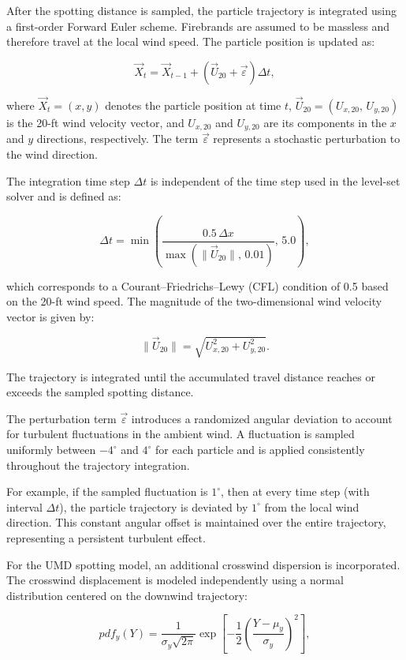 After the spotting distance is sampled, the particle trajectory is integrated using a first-order Forward Euler scheme. Firebrands are assumed to be massless and therefore travel at the local wind speed. The particle position is updated as:

\[
\vec{X}_t = \vec{X}_{t-1} + \left(\vec{U}_{20} + \vec{\varepsilon}\right)\Delta t,
\]

where $\vec{X}_t = (x,y)$ denotes the particle position at time $t$, $\vec{U}_{20} = (U_{x,20},\, U_{y,20})$ is the 20-ft wind velocity vector, and $U_{x,20}$ and $U_{y,20}$ are its components in the $x$ and $y$ directions, respectively. The term $\vec{\varepsilon}$ represents a stochastic perturbation to the wind direction.

The integration time step $\Delta t$ is independent of the time step used in the level-set solver and is defined as:

\[
\Delta t = \min\!\left( \frac{0.5 \, \Delta x}{\max(\|\vec{U}_{20}\|,\, 0.01)}, \, 5.0 \right),
\]

which corresponds to a Courant--Friedrichs--Lewy (CFL) condition of 0.5 based on the 20-ft wind speed. The magnitude of the two-dimensional wind velocity vector is given by:

\[
\|\vec{U}_{20}\| = \sqrt{U_{x,20}^2 + U_{y,20}^2}.
\]

The trajectory is integrated until the accumulated travel distance reaches or exceeds the sampled spotting distance.

The perturbation term $\vec{\varepsilon}$ introduces a randomized angular deviation to account for turbulent fluctuations in the ambient wind. A fluctuation is sampled uniformly between $-4^\circ$ and $4^\circ$ for each particle and is applied consistently throughout the trajectory integration.

For example, if the sampled fluctuation is $1^\circ$, then at every time step (with interval $\Delta t$), the particle trajectory is deviated by $1^\circ$ from the local wind direction. This constant angular offset is maintained over the entire trajectory, representing a persistent turbulent effect.

For the UMD spotting model, an additional crosswind dispersion is incorporated. The crosswind displacement is modeled independently using a normal distribution centered on the downwind trajectory:

\[
pdf_y(Y) = \frac{1}{\sigma_y \sqrt{2\pi}} 
\exp\!\left[-\frac{1}{2}\left(\frac{Y - \mu_y}{\sigma_y}\right)^2\right],
\]

